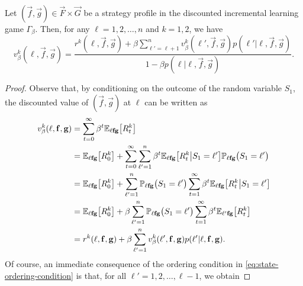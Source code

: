     \begin{proposition}  \label{prop:general-ordered-state-value}
        Let $(\vec{f}, \vec{g}) \in \vec{F} \times \vec{G}$ be a strategy profile in the discounted incremental learning game $\Gamma_\beta$.
        Then, for any $\ell = 1, 2, \ldots, n$ and $k = 1, 2$, we have
        \begin{equation}  \label{eq:general-ordered-state-value}
            v_\beta^k(\ell, \vec{f}, \vec{g})
                = \frac{r^k(\ell, \vec{f}, \vec{g}) + \beta \sum_{\ell' = \ell + 1}^n v_\beta^k(\ell', \vec{f}, \vec{g}) p(\ell' | \ell, \vec{f}, \vec{g})}{1 - \beta p(\ell | \ell, \vec{f}, \vec{g})}.
        \end{equation}
    \end{proposition}

    \begin{proof} 
        Observe that, by conditioning on the outcome of the random variable $S_1$, the discounted value of $(\vec{f}, \vec{g})$ at $\ell$ can be written as
        \begin{equation} \label{temp:general-ordered-state-value-1}
        \begin{split}
            v_\beta^k(\ell, \mathbf{f}, \mathbf{g})
                &= \sum_{t = 0}^\infty \beta^t \mathbb{E}_{\ell \mathbf{f} \mathbf{g}} \big[ R^k_t \big] \\
                &= \mathbb{E}_{\ell \mathbf{f} \mathbf{g}} \big[ R^k_0 \big] + \sum_{t = 0}^\infty \sum_{\ell' = 1}^n \beta^t \mathbb{E}_{\ell \mathbf{f} \mathbf{g}} \big[ R^k_t \big| S_1 = \ell' \big] \mathbb{P}_{\ell \mathbf{f} \mathbf{g}}\big(S_1 = \ell'\big) \\
                & = \mathbb{E}_{\ell \mathbf{f} \mathbf{g}} \big[ R^k_0 \big] + \sum_{\ell' = 1}^n  \mathbb{P}_{\ell \mathbf{f} \mathbf{g}} \big(S_1 = \ell'\big) \sum_{t = 1}^\infty \beta^t \mathbb{E}_{\ell \mathbf{f} \mathbf{g}} \big[ R^k_t \big| S_1 = \ell' \big] \\
                & = \mathbb{E}_{\ell \mathbf{f} \mathbf{g}} \big[ R^k_0 \big] + \beta \sum_{\ell' = 1}^n  \mathbb{P}_{\ell \mathbf{f} \mathbf{g}} \big(S_1 = \ell'\big) \sum_{t = 1}^\infty \beta^t \mathbb{E}_{\ell' \mathbf{f} \mathbf{g}} \big[ R^k_t \big] \\
                &=  r^k(\ell, \mathbf{f}, \mathbf{g}) + \beta \sum_{\ell' = 1}^n v^k_\beta(\ell', \mathbf{f}, \mathbf{g}) p(\ell' | \ell, \mathbf{f}, \mathbf{g}).
        \end{split}
        \end{equation}
        Of course, an immediate consequence of the ordering condition in \eqref{eq:state-ordering-condition} is that, for all $\ell' = 1, 2, \ldots, \ell - 1$, we obtain

\end{proof}
